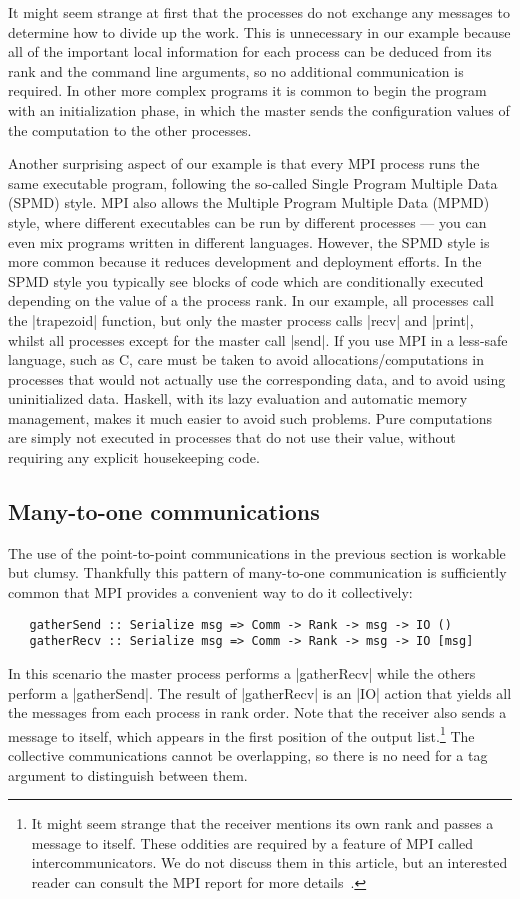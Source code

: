 \documentclass{tmr}
\begin{document}
It might seem strange at first that the processes do not exchange any
messages to determine how to divide up the work.
This is unnecessary in our example because all of the important
local information for each process can be deduced from its rank and
the command line arguments, so no additional communication is required.
In other more complex programs it is common to begin the program with
an initialization phase, in which the master sends the configuration
values of the computation to the other processes.

Another surprising aspect of our example is that every MPI process
runs the same executable program, following the so-called
Single Program Multiple Data (SPMD) style. MPI also allows
the Multiple Program Multiple Data (MPMD) style, where
different executables can be run by different processes ---
you can even mix programs written in different languages.
However, the SPMD
style is more common because it reduces development and deployment efforts.
In the SPMD style you typically see blocks of code which are
conditionally executed depending on the value of a the process rank.
In our example, all processes call the |trapezoid| function, but
only the master process calls |recv| and |print|, whilst
all processes except for the master call |send|.
If you use MPI in a less-safe language, such as C, care must
be taken to avoid allocations/computations in processes that would not
actually use the corresponding data, and to avoid using
uninitialized data. Haskell, with its lazy evaluation and automatic
memory management, makes it much easier to avoid such problems.
Pure computations are simply not executed in processes that do not use their
value, without requiring any explicit housekeeping code.

\subsection{Many-to-one communications}

The use of the point-to-point communications in the previous section
is workable but clumsy. Thankfully this pattern of many-to-one
communication is sufficiently common that MPI provides a
convenient way to do it collectively:
\begin{Verbatim}
   gatherSend :: Serialize msg => Comm -> Rank -> msg -> IO ()
   gatherRecv :: Serialize msg => Comm -> Rank -> msg -> IO [msg]
\end{Verbatim}
In this scenario the master process performs a
|gatherRecv| while the others perform a |gatherSend|.
The result of |gatherRecv| is an |IO| action that yields all
the messages from each process in rank order. Note that
the receiver also sends a message to itself, which appears in
the first position of the output list.\footnote{It might seem
strange that the receiver mentions its own rank and passes a message to itself.
These oddities are required by a feature of
MPI called intercommunicators. We do not discuss them in this
article, but an interested reader can consult the MPI report
for more details~\cite{mpi-report}.} The collective communications
cannot be overlapping, so there is no need for a tag argument to
distinguish between them.
\end{document}
